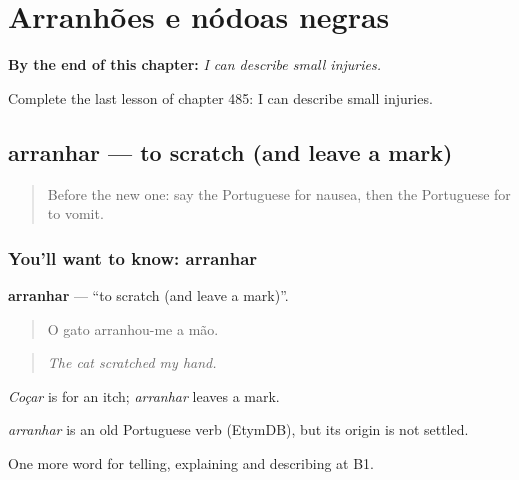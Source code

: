 
\chapter{Arranhões e nódoas negras}
\label{ch:pt-arranhoes-e-nodoas-negras}

\begin{chapteropening}
\textbf{By the end of this chapter:} \emph{I can describe small injuries.}

Complete the last lesson of chapter 485: I can describe small injuries.
\end{chapteropening}

\section[arranhar]{arranhar — to scratch (and leave a mark)}

\label{lesson:PT-C485-arranhar}



\begin{quote}
Before the new one: say the Portuguese for nausea, then the Portuguese for to vomit.
\end{quote}

\subsection*{You'll want to know: arranhar}
\textbf{arranhar} — \textquotedblleft{}to scratch (and leave a mark)\textquotedblright{}.

\begin{quote}
O gato arranhou-me a mão.
\end{quote}

\begin{quote}
\emph{The cat scratched my hand.}
\end{quote}

\emph{Coçar} is for an itch; \emph{arranhar} leaves a mark.

\begin{cousinweb}
\emph{arranhar} is an old Portuguese verb (EtymDB), but its origin is not settled.
\end{cousinweb}

\begin{grammarlens}[title={What you've built}]
One more word for telling, explaining and describing at B1.
\end{grammarlens}

